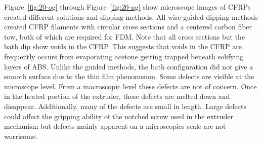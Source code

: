 
Figure~\ref{fig:20-og} through Figure~\ref{fig:20-ng} show microscope images of CFRPs created different solutions and dipping methods. All wire-guided dipping methods created CFRP filaments with circular cross sections and a centered carbon fiber tow, both of which are required for FDM. Note that all cross sections but the bath dip show voids in the CFRP. This suggests that voids in the CFRP are frequently occurs from evaporating acetone getting trapped beneath solifying layers of ABS.  Unlike the guided methods, the bath configuration did not give a smooth surface due to the thin film phenomenon. Some defects are visible at the microscope level. From a macroscopic  level these defects are not of concern. Once in the heated portion of the extruder, these defects are melted down and disappear. Additionally, many of the defects are small in length. Large defects could affect the gripping ability of the notched screw used in the extruder mechanism but defects mainly apparent on a microscopics scale are not worrisome.\\



